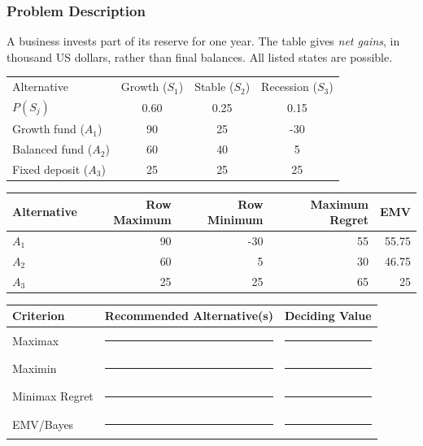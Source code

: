 \subsubsection*{Problem Description}
A business invests part of its reserve for one year. The table gives \emph{net gains}, in thousand US dollars, rather than final balances. All listed states are possible.
\begin{center}
\begin{tabular}{lccc}\toprule
Alternative & Growth ($S_1$) & Stable ($S_2$) & Recession ($S_3$)\\
$P(S_j)$ & 0.60 & 0.25 & 0.15\\\midrule
Growth fund ($A_1$) & 90 & 25 & -30\\
Balanced fund ($A_2$) & 60 & 40 & 5\\
Fixed deposit ($A_3$) & 25 & 25 & 25\\\bottomrule
\end{tabular}
\end{center}
\begin{center}
\begin{tabular}{lrrrr}\toprule
Alternative & Row Maximum & Row Minimum & Maximum Regret & EMV\\\midrule
$A_1$ & 90 & -30 & 55 & 55.75\\
$A_2$ & 60 & 5 & 30 & 46.75\\
$A_3$ & 25 & 25 & 65 & 25\\\bottomrule
\end{tabular}
\end{center}
\begin{center}
\begin{tabular}{lll}\toprule
Criterion & Recommended Alternative(s) & Deciding Value\\\midrule
Maximax & \rule{3cm}{0.4pt} & \rule{2cm}{0.4pt}\\
Maximin & \rule{3cm}{0.4pt} & \rule{2cm}{0.4pt}\\
Minimax Regret & \rule{3cm}{0.4pt} & \rule{2cm}{0.4pt}\\
EMV/Bayes & \rule{3cm}{0.4pt} & \rule{2cm}{0.4pt}\\\bottomrule
\end{tabular}
\end{center}


